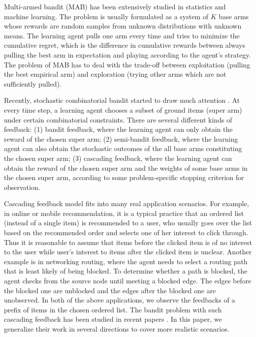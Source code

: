\documentclass{article}
\begin{document}
Multi-armed bandit (MAB) has been extensively studied in statistics and machine learning. 
The problem is usually formulated as a system of $K$ base arms whose rewards are random samples from unknown distributions with unknown means.
 The learning agent pulls one arm every time and tries to minimize the cumulative regret, 
which is the difference in cumulative rewards between always pulling the best arm in expectation and
 playing according to the agent's strategy.
The problem of MAB has to deal with the trade-off between exploitation (pulling the best empirical arm) and exploration (trying other arms which are not sufficiently pulled).

Recently, stochastic combinatorial bandit started to draw much attention \cite{gai2012combinatorial,chen2013combinatorial,lin2014combinatorial,GMM14,chen2014pure,KWAEE14,kveton2014tight,kveton2015cascading,kveton2015combinatorial,lin2015online,Combes2015}. 
At every time step, a learning agent chooses a subset of ground items (super arm) under certain combinatorial constraints. There are several different kinds of feedback: (1) bandit feedback, where the learning agent can only obtain the reward of the chosen super arm; (2) semi-bandit feedback, where the learning agent can also obtain the stochastic outcomes of the all base arms constituting the chosen super arm; 
(3) cascading feedback, where the learning agent can obtain the reward of the chosen super arm and the weights of some base arms in the chosen super arm, according to some problem-specific stopping criterion for observation.

Cascading feedback model fits into many real application scenarios.
For example, in online or mobile recommendation, it is a typical practice that an ordered list
	(instead of a single item) is recommended to a user, who
	usually goes over the list based on the recommended order and selects one of her interest to
	click through.
Thus it is reasonable to assume that items before the clicked item is of no interest to the user
	while user's interest to items after the clicked item is unclear.
Another example is in networking routing, where the agent needs to select a routing path that is least
	likely of being blocked.
To determine whether a path is blocked, the agent checks from the source node until meeting a blocked edge. 
The edges before the blocked one are unblocked and the edges after the blocked one are unobserved.
In both of the above applications, we observe the feedbacks of a prefix of items in the chosen ordered list. The bandit problem with such cascading feedback has been studied in recent papers \cite{kveton2015cascading,kveton2015combinatorial}. 
In this paper, we generalize their work in several directions to cover more realistic scenarios.
\end{document}
